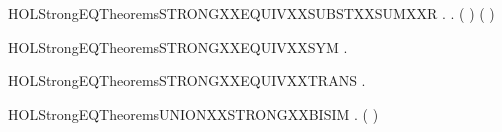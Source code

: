 \newcommand{\HOLStrongEQTheoremsSTRONGXXEQUIVXXSUBSTXXSUMXXL}{\UseVerbatim{HOLStrongEQTheoremsSTRONGXXEQUIVXXSUBSTXXSUMXXL}}
\begin{SaveVerbatim}{HOLStrongEQTheoremsSTRONGXXEQUIVXXSUBSTXXSUMXXR}
\HOLTokenTurnstile{} \HOLSymConst{\HOLTokenForall{}} .
          \HOLSymConst{\HOLTokenImp{}}
       \HOLSymConst{\HOLTokenForall{}}.  ( \HOLSymConst{+} ) ( \HOLSymConst{+} )
\end{SaveVerbatim}
\newcommand{\HOLStrongEQTheoremsSTRONGXXEQUIVXXSUBSTXXSUMXXR}{\UseVerbatim{HOLStrongEQTheoremsSTRONGXXEQUIVXXSUBSTXXSUMXXR}}
\begin{SaveVerbatim}{HOLStrongEQTheoremsSTRONGXXEQUIVXXSYM}
\HOLTokenTurnstile{} \HOLSymConst{\HOLTokenForall{}} .    \HOLSymConst{\HOLTokenImp{}}   
\end{SaveVerbatim}
\newcommand{\HOLStrongEQTheoremsSTRONGXXEQUIVXXSYM}{\UseVerbatim{HOLStrongEQTheoremsSTRONGXXEQUIVXXSYM}}
\begin{SaveVerbatim}{HOLStrongEQTheoremsSTRONGXXEQUIVXXTRANS}
\HOLTokenTurnstile{} \HOLSymConst{\HOLTokenForall{}}  .
          \HOLSymConst{\HOLTokenConj{}}    \HOLSymConst{\HOLTokenImp{}}
         
\end{SaveVerbatim}
\newcommand{\HOLStrongEQTheoremsSTRONGXXEQUIVXXTRANS}{\UseVerbatim{HOLStrongEQTheoremsSTRONGXXEQUIVXXTRANS}}
\begin{SaveVerbatim}{HOLStrongEQTheoremsUNIONXXSTRONGXXBISIM}
\HOLTokenTurnstile{} \HOLSymConst{\HOLTokenForall{}} .
         \HOLSymConst{\HOLTokenConj{}}   \HOLSymConst{\HOLTokenImp{}}
        (  )
\end{SaveVerbatim}
